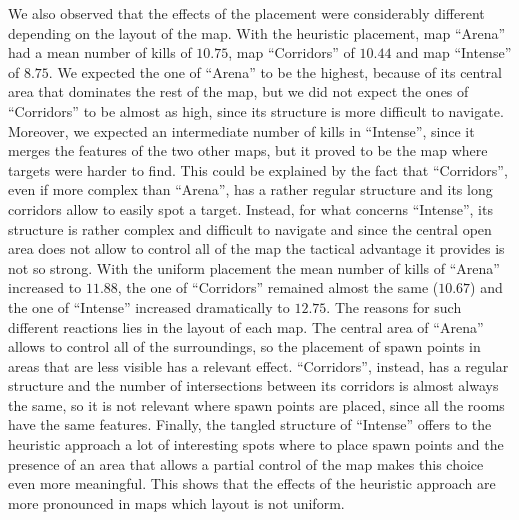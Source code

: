 We also observed that the effects of the placement were considerably different depending on the layout of the map. With the heuristic placement, map ``Arena'' had a mean number of kills of $10.75$, map ``Corridors'' of $10.44$ and map ``Intense'' of $8.75$. We expected the one of ``Arena'' to be the highest, because of its central area that dominates the rest of the map, but we did not expect the ones of ``Corridors'' to be almost as high, since its structure is more difficult to navigate. Moreover, we expected an intermediate number of kills in ``Intense'', since it merges the features of the two other maps, but it proved to be the map where targets were harder to find. This could be explained by the fact that ``Corridors'', even if more complex than ``Arena'', has a rather regular structure and its long corridors allow to easily spot a target. Instead, for what concerns ``Intense'', its structure is rather complex and difficult to navigate and since the central open area does not allow to control all of the map the tactical advantage it provides is not so strong. With the uniform placement the mean number of kills of ``Arena'' increased to $11.88$, the one of ``Corridors'' remained almost the same ($10.67$) and the one of ``Intense'' increased dramatically to $12.75$. The reasons for such different reactions lies in the layout of each map. The central area of ``Arena'' allows to control all of the surroundings, so the placement of spawn points in areas that are less visible has a relevant effect. ``Corridors'', instead, has a regular structure and the number of intersections between its corridors is almost always the same, so it is not relevant where spawn points are placed, since all the rooms have the same features. Finally, the tangled structure of ``Intense'' offers to the heuristic approach a lot of interesting spots where to place spawn points and the presence of an area that allows a partial control of the map makes this choice even more meaningful. This shows that the effects of the heuristic approach are more pronounced in maps which layout is not uniform.

